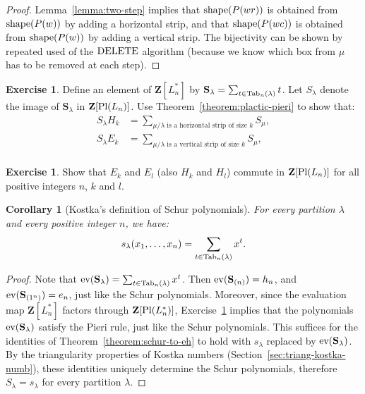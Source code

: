 \documentclass[11pt]{amsproc}
\newtheorem{corollary}[theorem]{Corollary}
\theoremstyle{definition}
\theoremstyle{example}
\newtheorem{exercise}[theorem]{Exercise}
\newcommand{\ev}{\textup{ev}}
\newcommand{\del}{\textup{DELETE}}
\newcommand{\pl}{\textup{Pl}}
\newcommand{\shape}{\textup{shape}}
\newcommand{\Tab}{\textup{Tab}}
\begin{document}
\begin{proof}
  Lemma~\ref{lemma:two-step} implies that $\shape(P(wr))$ is obtained from\linebreak $\shape(P(w))$ by adding a horizontal strip, and that $\shape(P(wc))$ is obtained from $\shape(P(w))$ by adding a vertical strip.
  The bijectivity can be shown by repeated used of the $\del$ algorithm (because we know which box from $\mu$ has to be removed at each step).
\end{proof}
\begin{exercise}
  \label{exercise:plactic-pieri}
  Define an element of $\mathbf Z[L_n^*]$ by $\mathbf S_\lambda=\sum_{t\in \Tab_n(\lambda)} t$.
  Let $S_\lambda$ denote the image of $\mathbf S_\lambda$ in $\mathbf Z[\pl(L_n)]$.
  Use Theorem~\ref{theorem:plactic-pieri} to show that:
  \begin{align*}
    S_\lambda H_k&=\sum_{\mu/\lambda \text{ is a horizontal strip of size $k$}} S_\mu,\\
    S_\lambda E_k&=\sum_{\mu/\lambda \text{ is a vertical strip of size $k$}} S_\mu,\\
  \end{align*}
\end{exercise}
\begin{exercise}
  Show that $E_k$ and $E_l$ (also $H_k$ and $H_l$) commute in $\mathbf Z[\pl(L_n)]$ for all positive integers $n$, $k$ and $l$.
\end{exercise}
\begin{corollary}
  [Kostka's definition of Schur polynomials]
  \label{corollary:kostka-def-schur}
  For every partition $\lambda$ and every positive integer $n$, we have:
  \begin{displaymath}
    s_\lambda(x_1,\dotsc,x_n) = \sum_{t\in\Tab_n(\lambda)} x^t.
  \end{displaymath}
\end{corollary}
\begin{proof}
  Note that $\ev(\mathbf S_\lambda) = \sum_{t\in \Tab_n(\lambda)} x^t$.
  Then $\ev(\mathbf S_{(n)}) = h_n$, and $\ev(\mathbf S_{(1^n)}) = e_n$, just like the Schur polynomials.
  Moreover, since the evaluation map $\mathbf Z[L_n^*]$ factors through $\mathbf Z[\pl(L_n^*)]$, Exercise~\ref{exercise:plactic-pieri} implies that the polynomials $\ev(\mathbf S_\lambda)$ satisfy the Pieri rule, just like the Schur polynomials.
  This suffices for the identities of Theorem~\ref{theorem:schur-to-eh} to hold with $s_\lambda$ replaced by $\ev(\mathbf S_\lambda)$.
  By the triangularity properties of Kostka numbers (Section~\ref{sec:triang-kostka-numb}), these identities uniquely determine the Schur polynomials, therefore $S_\lambda=s_\lambda$ for every partition $\lambda$.
\end{proof}
\end{document}
